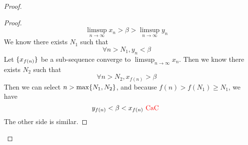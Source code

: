 \documentclass{report}
\begin{document}
\begin{proof}
\begin{proof}
\begin{equation}
\limsup_{n\to\infty} x_n>\beta >\limsup_{n\to\infty} y_n
\end{equation}
We know there exists $N_1$ such that
 \begin{equation}
\forall n>N_1, y_n<\beta 
\end{equation}
Let $\{ x_{f(n)} \}$ be a sub-sequence converge to $\limsup_{n\to\infty} x_n$. Then we know there exists $N_2$ such that
 \begin{equation}
\forall n>N_2, x_{f(n)}>\beta 
\end{equation}
Then we can select $n>\max \{ N_1,N_2 \}$, and because $f(n)>f(N_1)\geq N_1$, we have
\begin{equation}
y_{f(n)}<\beta <x_{f(n)}\text{ \textcolor{red}{CaC} }
\end{equation}
The other side is similar.
\end{proof}

\end{proof}
\end{document}
